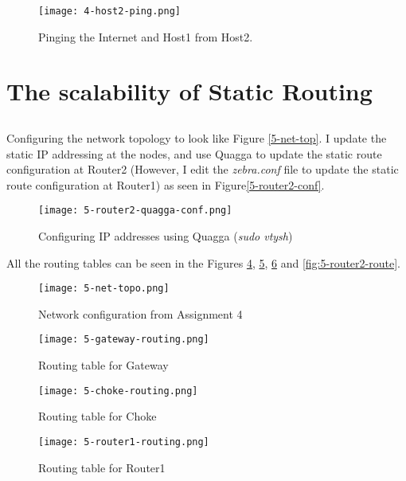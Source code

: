 \documentclass{article}
\begin{document}
\begin{figure}[!h]
    \texttt{[image: 4-host2-ping.png]}
    \label{fig:4-host2-pinging}
    \caption{Pinging the Internet and Host1 from Host2.}
\end{figure}

\section{The scalability of Static Routing}

\subsection{}
Configuring the network topology to look like Figure {\ref{5-net-top}}. I update the static IP addressing at the nodes, and use Quagga to update the static route configuration at Router2 (However, I edit the \textit{zebra.conf} file to update the static route configuration at Router1) as seen in Figure{\ref{5-router2-conf}}.

\begin{figure}[h]
    \texttt{[image: 5-router2-quagga-conf.png]}
    \label{fig:5-router2-conf}
    \caption{Configuring IP addresses using Quagga (\textit{sudo vtysh})}
\end{figure}


All the routing tables can be seen in the Figures {\ref{fig:5-gateway-route}}, \ref{fig:5-choke-route}, \ref{fig:5-router1-route} and \ref{fig:5-router2-route}.

\begin{figure}[h]
    \texttt{[image: 5-net-topo.png]}
    \label{fig:5-net-top}
    \caption{Network configuration from Assignment 4}
\end{figure}

\begin{figure}[h]
    \texttt{[image: 5-gateway-routing.png]}
    \label{fig:5-gateway-route}
    \caption{Routing table for Gateway}
\end{figure}

\begin{figure}[h]
    \texttt{[image: 5-choke-routing.png]}
    \label{fig:5-choke-route}
    \caption{Routing table for Choke}
\end{figure}

\begin{figure}[h]
    \texttt{[image: 5-router1-routing.png]}
    \label{fig:5-router1-route}
    \caption{Routing table for Router1}
\end{figure}
\end{document}
